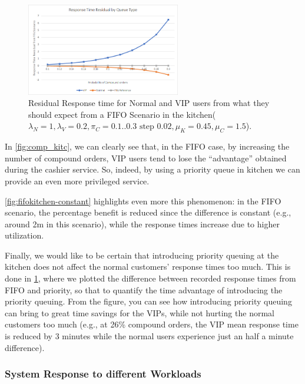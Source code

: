 \begin{figure}[h!]
  \centering
  \includegraphics[width=0.6\textwidth]{figs/responseTimeResidualKitchen.png}
  \caption{Residual Response time for Normal and VIP users from what they should expect from a FIFO Scenario in the kitchen($\lambda_N=1,\lambda_V=0.2,\pi_C={{0.1..0.3 \text{ step } 0.02}}, \mu_K=0.45, \mu_C=1.5$).}
  \label{fig:residual}
\end{figure}

In \cref{fig:comp_kitc}, we can clearly see that, in the FIFO case, by increasing the number of compound orders, VIP users tend to lose the ``advantage'' obtained during the cashier service. So, indeed, by using a priority queue in kitchen we can provide an even more privileged service. 

\cref{fig:fifokitchen-constant} highlights even more this phenomenon: in the FIFO scenario, the percentage benefit is reduced since the difference is constant (e.g., around 2m in this scenario), while the response times increase due to higher utilization.

Finally, we would like to be certain that introducing priority queuing at the kitchen does not affect the normal customers' response times too much. This is done in \cref{fig:residual}, where we plotted the difference between recorded response times from FIFO and priority, so that to quantify the time advantage of introducing the priority queuing. From the figure, you can see how introducing priority queuing can bring to great time savings for the VIPs, while not hurting the normal customers too much (e.g., at 26\% compound orders, the VIP mean response time is reduced by 3 minutes while the normal users experience just an half a minute difference). 

\subsubsection{System Response to different Workloads}

